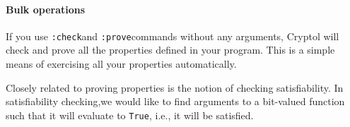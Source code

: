 \paragraph*{Bulk operations} If you use {\tt :check}\indCmdCheck and
{\tt :prove}\indCmdProve commands without any arguments, Cryptol will
check and prove all the properties defined in your program. This is a
simple means of exercising all your properties automatically.



Closely related to proving properties is the notion of checking
satisfiability. In satisfiability checking,\indCmdSat we would like to find
arguments to a bit-valued function such that it will evaluate to {\tt True},
i.e., it will be satisfied.\indSat

